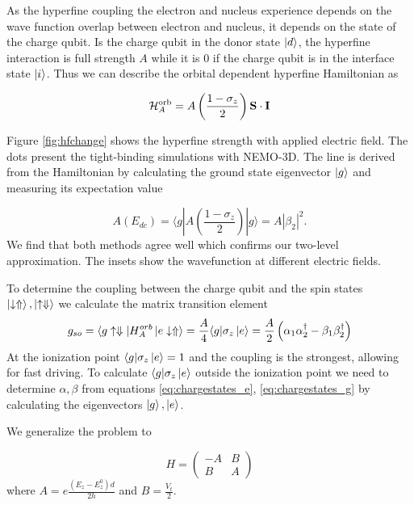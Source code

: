 As the hyperfine coupling the electron and nucleus experience depends on the wave function overlap between electron and nucleus, it depends on the state of the charge qubit. Is the charge qubit in the donor state $\ket{d}$, the hyperfine interaction is full strength $A$ while it is $0$ if the charge qubit is in the interface state $\ket{i}$. Thus we can describe the orbital dependent hyperfine Hamiltonian as 

\begin{equation} \label{eq:H_A}
\mathcal{H}_{A}^{\rm orb}=A\left(\frac{1 - \sigma_z}{2}\right){\bf S\cdot I}
\end{equation}

Figure \ref{fig:hfchange} shows the hyperfine strength with applied electric field. The dots present the tight-binding simulations with NEMO-3D\cite{Klimeck2007a,Klimeck2007b}. The line is derived from the Hamiltonian by calculating the ground state eigenvector $\ket{g}$ and measuring its expectation value 

\begin{equation}\label{eq:AE}
A(E_{dc})=\langle g|A\left(\frac{1 - \sigma_z}{2}\right)|g\rangle=A|\beta_2|^2.
\end{equation}
We find that both methods agree well which confirms our two-level approximation. The insets show the wavefunction at different electric fields. 

To determine the coupling between the charge qubit and the spin states $\ket{\downarrow\Uparrow}, \ket{\uparrow\Downarrow}$ we calculate the matrix transition element 
\begin{equation}\label{eq:g_so}
g_{so}=\langle g\uparrow\Downarrow|H_{A}^{orb}\ket{e\downarrow\Uparrow}=\frac{A}{4}\langle g|\sigma_z\ket{e} =\frac{A}{2}\left(\alpha_1\alpha_2^\dagger-\beta_1\beta_2^\dagger\right)
\end{equation}
At the ionization point $\langle g|\sigma_z\ket{e}=1$ and the coupling is the strongest, allowing for fast driving. To calculate $\langle g|\sigma_z\ket{e}$ outside the ionization point we need to determine $\alpha,\beta$ from equations \eqref{eq:chargestates_e}, \eqref{eq:chargestates_g} by calculating the eigenvectors $\ket{g},\ket{e}$. 

We generalize the problem to 

\begin{equation}
H=\begin{pmatrix}
-A & B\\
B & A
\end{pmatrix}
\end{equation}
where $A=e\frac{\left(E_z-E_z^0\right)d}{2h}$ and $B=\frac{V_t}{2}$.

